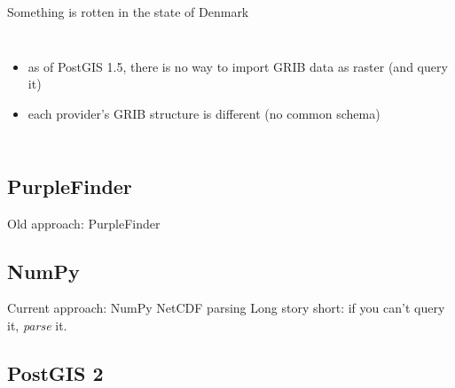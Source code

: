 \documentclass[xcolor=svgnames]{beamer}
\begin{document}
\begin{frame}{Something is rotten in the state of Denmark}
\begin{columns}[c]
{\begin{itemize}
                        \item as of PostGIS 1.5, there is no way to import GRIB data as raster (and query it)
                        \item each provider's GRIB structure is different (no common schema)\\\vspace{0.1\textheight}
                    \end{itemize}
                }
            \end{columns}
        \end{frame}

    \subsection{PurpleFinder}

        \begin{frame}{Old approach: PurpleFinder}
        \end{frame}

    \subsection{NumPy}

        \begin{frame}{Current approach: NumPy NetCDF parsing}
            Long story short: if you can't query it, \textit{parse} it.
            \begin{center}
                \resizebox{0.9\textwidth}{!}{%
                    \begin{tikzpicture}
                        
                    \end{tikzpicture}
                }
            \end{center}
        \end{frame}

    \subsection{PostGIS 2}
\end{document}
